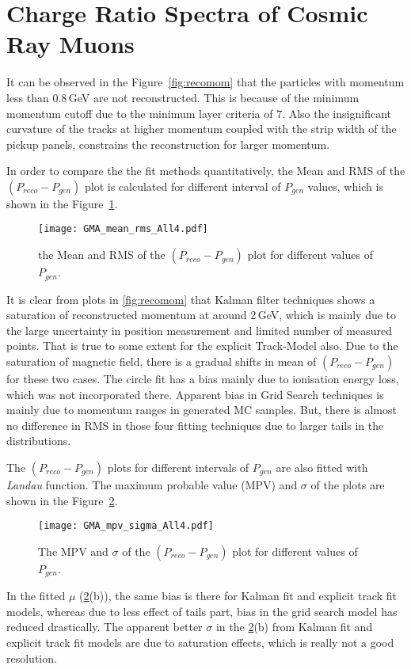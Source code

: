 \section{Charge Ratio Spectra of Cosmic Ray Muons}
\label{section:multiresult}

It can be observed in the Figure~\ref{fig:recomom} that the particles
with momentum less than 0.8\,GeV are not reconstructed. This is because
of the minimum momentum cutoff due to the minimum layer criteria of 7.
Also the insignificant curvature of the tracks at higher momentum
coupled with the strip width of the pickup panels, constrains the
reconstruction for larger momentum.

In order to compare the the fit methods quantitatively, the Mean and
RMS of the $\left(P_{reco}-P_{gen}\right)$ plot is calculated for
different interval of $P_{gen}$ values, which is shown in the
Figure~\ref{fig:meanrms}.
\begin{figure}[h]
  \centering
  \texttt{[image: GMA\_mean\_rms\_All4.pdf]}
  \caption{the Mean and RMS of the $\left(P_{reco}-P_{gen}\right)$ plot
    for different values of $P_{gen}$.}
  \label{fig:meanrms}
\end{figure}
It is clear from plots in \ref{fig:recomom} that Kalman filter techniques shows
a saturation of reconstructed momentum at around 2\,GeV, which is mainly due to
the large uncertainty in position measurement and limited number of measured points.
That is true to some extent for the explicit Track-Model also. Due to the saturation
of magnetic field, there is a gradual shifts in mean of  $\left(P_{reco}-P_{gen}\right)$
for these two cases. The circle fit has a bias mainly due to ionisation energy loss, which
was not incorporated there. Apparent bias in Grid Search techniques is mainly due to
momentum ranges in generated MC samples. But, there is almost no difference in RMS in
those four fitting techniques due to larger tails in the distributions.

The $\left(P_{reco}-P_{gen}\right)$ plots for different intervals of
$P_{gen}$ are also fitted with {\it Landau} function. The maximum
probable value (MPV) and $\sigma$ of the plots are shown in the
Figure~\ref{fig:mpvsigma}.
\begin{figure}[h]
  \centering
  \texttt{[image: GMA\_mpv\_sigma\_All4.pdf]}
  \caption{The MPV and $\sigma$ of the $\left(P_{reco}-P_{gen}\right)$
    plot for different values of $P_{gen}$.}
  \label{fig:mpvsigma}
\end{figure}
In the fitted $\mu$ (\ref{fig:mpvsigma}(b)), the same bias is there for Kalman fit
and explicit track fit models, whereas due to less effect of tails part, bias in
the grid search model has reduced drastically. The apparent better $\sigma$ in
the \ref{fig:mpvsigma}(b) from Kalman fit and explicit track fit models are due to
saturation effects, which is really not a good resolution.

